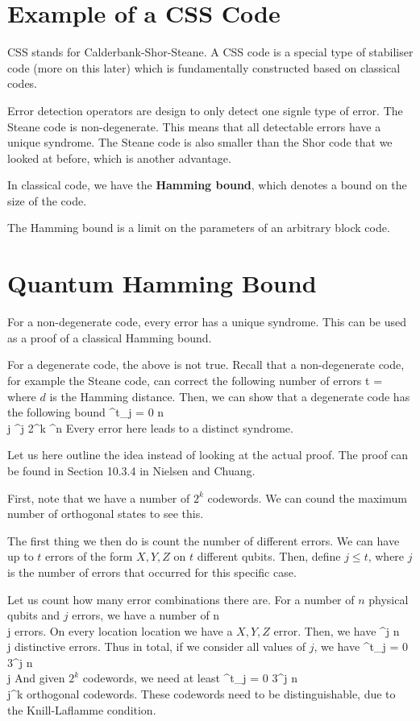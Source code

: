 \section{Example of a CSS Code}
CSS stands for Calderbank-Shor-Steane. A CSS code is a special type of stabiliser code (more on this later) which is fundamentally constructed based on classical codes. 

Error detection operators are design to only detect one signle type of error. The Steane code is non-degenerate. This means that all detectable errors have a unique syndrome. The Steane code is also smaller than the Shor code that we looked at before, which is another advantage. 

In classical code, we have the \textbf{Hamming bound}, which denotes a bound on the size of the code. 

The Hamming bound is a limit on the parameters of an arbitrary block code. 

\section{Quantum Hamming Bound}
For a non-degenerate code, every error has a unique syndrome. This can be used as a proof of a classical Hamming bound. 

For a degenerate code, the above is not true. Recall that a non-degenerate code, for example the Steane code, can correct the following number of errors
\beq
t = 
\eeq
where $d$ is the Hamming distance. Then, we can show that a degenerate code has the following bound
\beq
\sum^t_{j = 0} \bpmat n \\ j ^j 2^k ^n
\eeq
Every error here leads to a distinct syndrome. 

Let us here outline the idea instead of looking at the actual proof. The proof can be found in Section 10.3.4 in Nielsen and Chuang. 

First, note that we have a number of $2^k$ codewords. We can cound the maximum number of orthogonal states to see this. 

The first thing we then do is count the number of different errors. We can have up to $t$ errors of the form $X,Y,Z$ on $t$ different qubits. Then, define $j \leq t$, where $j$ is the number of errors that occurred for this specific case. 

Let us count how many error combinations there are. For a number of $n$ physical qubits and $j$ errors, we have a number of 
\beq
\bpmat n \\j \epmat
\eeq
errors. On every location location we have a $X,Y,Z$ error. Then, we have 
^j \bpmat n \\j \epmat
\eeq
distinctive errors. Thus in total, if we consider all values of $j$, we have 
\beq
\sum^t_{j = 0} 3^j \bpmat n \\j \epmat
\eeq
And given $2^k$ codewords, we need at least 
\beq
\sum^t_{j = 0} 3^j \bpmat n \\j{}^k
\eeq
orthogonal codewords. These codewords need to be distinguishable, due to the Knill-Laflamme condition. 

